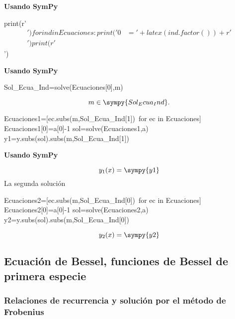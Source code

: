 \begin{frame}[fragile]{\textbf{Usando SymPy}}

\begin{sympycode}[][numbers=left,frame=single,framesep=5mm]
print(r'\begin{align*}') 
for ind in Ecuaciones:
    print('0&='+latex(ind.factor())+r'\\') 
print(r'\end{align*}')
\end{sympycode}
\end{frame}

\begin{frame}[fragile]{\textbf{Usando SymPy}}


\begin{sympyblock}[][numbers=left,frame=single,framesep=5mm]
Sol_Ecua_Ind=solve(Ecuaciones[0],m)
\end{sympyblock}

\[m\in \sympy{Sol_Ecua_Ind}.\]




\begin{sympyblock}[][numbers=left,frame=single,framesep=5mm]
Ecuaciones1=[ec.subs(m,Sol_Ecua_Ind[1])\
    for ec in Ecuaciones]
Ecuaciones1[0]=a[0]-1
sol=solve(Ecuaciones1,a)
y1=y.subs(sol).subs(m,Sol_Ecua_Ind[1])
\end{sympyblock}



\end{frame}

\begin{frame}[fragile]{\textbf{Usando SymPy}}


\[
 y_1(x)=\sympy{y1}
\]
La segunda solución 

\begin{sympyblock}[][numbers=left,frame=single,framesep=5mm]
Ecuaciones2=[ec.subs(m,Sol_Ecua_Ind[0])\
    for ec in Ecuaciones]
Ecuaciones2[0]=a[0]-1
sol=solve(Ecuaciones2,a)
y2=y.subs(sol).subs(m,Sol_Ecua_Ind[0])
\end{sympyblock}
\[
 y_2(x)=\sympy{y2}
\]
\end{frame}



\subsection{Ecuación de Bessel, funciones de Bessel de primera especie}\label{sec:bessel_1}
\subsubsection{Relaciones de recurrencia y solución por el método de Frobenius}

